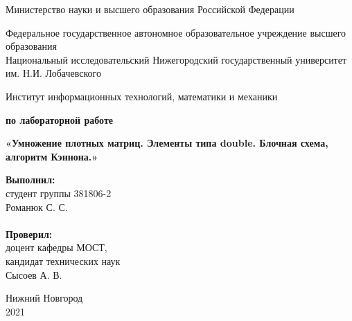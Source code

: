 \documentclass{report}
\begin{document}
\begin{titlepage}

\begin{center}
Министерство науки и высшего образования Российской Федерации
\end{center}

\begin{center}
Федеральное государственное автономное образовательное учреждение высшего образования \\
Национальный исследовательский Нижегородский государственный университет им. Н.И. Лобачевского
\end{center}

\begin{center}
Институт информационных технологий, математики и механики
\end{center}

\vspace{4em}

\begin{center}
\textbf{ по лабораторной работе} \\
\end{center}
\begin{center}
\textbf{\Large«Умножение плотных матриц. Элементы типа double. Блочная схема, алгоритм Кэннона.»} \\
\end{center}

\vspace{4em}

\newbox{\lbox}
\newlength{\maxl}
\setlength{\maxl}{\wd\lbox}
\hfill\parbox{7cm}{
\hspace*{5cm}\hspace*{-5cm}\textbf{Выполнил:} \\ студент группы 381806-2 \\ Романюк С. С. \\
\\
\hspace*{5cm}\hspace*{-5cm}\textbf{Проверил:}\\ доцент кафедры МОСТ, \\ кандидат технических наук \\ Сысоев А. В.\\}

\vspace{\fill}

\begin{center} Нижний Новгород \\ 2021 \end{center}

\end{titlepage}
\end{document}
